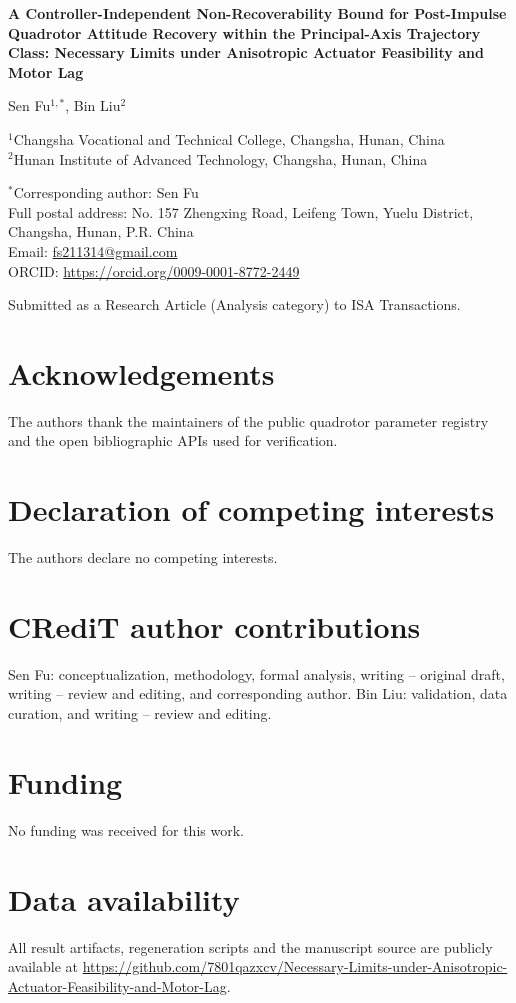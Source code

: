\documentclass[12pt]{article}
\begin{document}
\begin{center}
{\Large\bfseries A Controller-Independent Non-Recoverability Bound for Post-Impulse
Quadrotor Attitude Recovery within the Principal-Axis Trajectory Class:
Necessary Limits under Anisotropic Actuator Feasibility and Motor Lag}
\par\vspace{1.2em}
Sen Fu$^{1,*}$, Bin Liu$^{2}$
\par\vspace{0.6em}
$^{1}$Changsha Vocational and Technical College, Changsha, Hunan, China\\
$^{2}$Hunan Institute of Advanced Technology, Changsha, Hunan, China
\par\vspace{0.6em}
$^{*}$Corresponding author: Sen Fu\\
Full postal address: No. 157 Zhengxing Road, Leifeng Town, Yuelu District,\\
Changsha, Hunan, P.R. China\\
Email: \url{fs211314@gmail.com}\\
ORCID: \url{https://orcid.org/0009-0001-8772-2449}
\par\vspace{0.8em}
Submitted as a Research Article (Analysis category) to ISA Transactions.
\end{center}

\vspace{1em}
\section*{Acknowledgements}
The authors thank the maintainers of the public quadrotor parameter registry and
the open bibliographic APIs used for verification.

\section*{Declaration of competing interests}
The authors declare no competing interests.

\section*{CRediT author contributions}
Sen Fu: conceptualization, methodology, formal analysis, writing -- original
draft, writing -- review and editing, and corresponding author. Bin Liu:
validation, data curation, and writing -- review and editing.

\section*{Funding}
No funding was received for this work.

\section*{Data availability}
{\raggedright
All result artifacts, regeneration scripts and the manuscript source are
publicly available at
\url{https://github.com/7801qazxcv/Necessary-Limits-under-Anisotropic-Actuator-Feasibility-and-Motor-Lag}.
\par}
\end{document}
